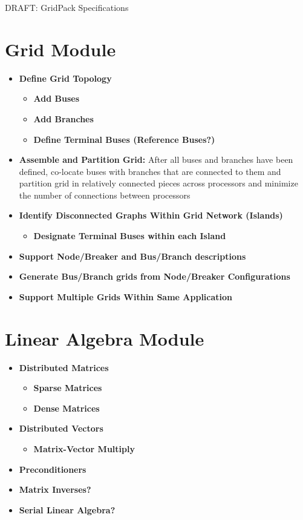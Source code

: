 \documentclass[12pt]{article}
\begin{document}
\begin{titlepage}
\begin{center}
{\LARGE DRAFT: GridPack Specifications}
\end{center}
\end{titlepage}
\newpage
\pagestyle{plain}
\section{Grid Module}
\begin{itemize}
\item{\bf Define Grid Topology}
\begin{itemize}
\item{\bf Add Buses}
\item{\bf Add Branches}
\item{\bf Define Terminal Buses (Reference Buses?)}
\end{itemize}
\item{\bf Assemble and Partition Grid:} After all buses and branches have
been defined, co-locate buses with branches that are connected to them and
partition grid in relatively connected pieces across processors and minimize the
number of connections between processors
\item{\bf Identify Disconnected Graphs Within Grid Network (Islands)}
\begin{itemize}
\item{\bf Designate Terminal Buses within each Island}
\end{itemize}
\item{\bf Support Node/Breaker and Bus/Branch descriptions}
\item{\bf Generate Bus/Branch grids from Node/Breaker Configurations}
\item{\bf Support Multiple Grids Within Same Application}
\end{itemize}

\section{Linear Algebra Module}
\begin{itemize}
\item{\bf Distributed Matrices}
\begin{itemize}
\item{\bf Sparse Matrices}
\item{\bf Dense Matrices}
\end{itemize}
\item{\bf Distributed Vectors}
\begin{itemize}
\item{\bf Matrix-Vector Multiply}
\end{itemize}
\item{\bf Preconditioners}
\item{\bf Matrix Inverses?}
\item{\bf Serial Linear Algebra?}
\end{itemize}
\end{document}
